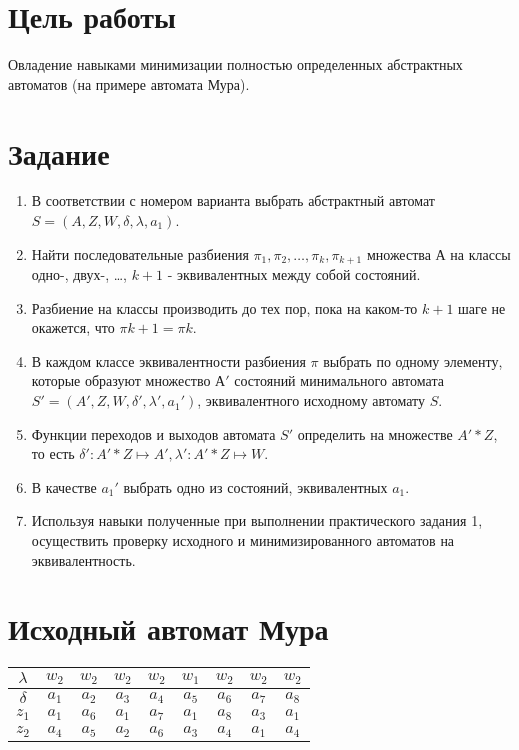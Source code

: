\documentclass[listings]{labreport}
\begin{document}
\maketitlepage

\section*{Цель работы}

Овладение навыками минимизации полностью определенных абстрактных автоматов
(на примере автомата Мура).

\section*{Задание}

\begin{enumerate}
\item В соответствии с номером варианта выбрать абстрактный автомат $S=(A,Z,W,\delta,\lambda,a_1)$.
\item Найти последовательные разбиения $\pi_1,\pi_2,\ldots,\pi_k,\pi_{k+1}$ множества $А$ на классы одно-, двух-, \ldots, $k+1$ - эквивалентных между собой состояний.
\item Разбиение на классы производить до тех пор, пока на каком-то $k+1$ шаге не окажется, что $\pi k+1 = \pi k$.
\item В каждом классе эквивалентности разбиения $\pi$ выбрать по одному элементу, которые образуют множество $А'$ состояний минимального автомата $S'=(A',Z,W,\delta',\lambda',a_1')$, эквивалентного исходному автомату $S$.
\item Функции переходов и выходов автомата $S'$ определить на множестве $A' *Z$, то есть $\delta': A' *Z \mapsto A', \lambda': A' *Z \mapsto W$.
\item В качестве $a_1'$ выбрать одно из состояний, эквивалентных $a_1$.
\item Используя навыки полученные при выполнении практического задания 1, осуществить проверку исходного и минимизированного автоматов на эквивалентность. 
\end{enumerate}

\section*{Исходный автомат Мура}

\begin{tabular}{|*{9}{c|}}
\hline
$\lambda$ & $w_2$ & $w_2$ & $w_2$ & $w_2$ & $w_1$ & $w_2$ & $w_2$ & $w_2$ \\\hline
$\delta$  & $a_1$ & $a_2$ & $a_3$ & $a_4$ & $a_5$ & $a_6$ & $a_7$ & $a_8$ \\\hline
$z_1$     & $a_1$ & $a_6$ & $a_1$ & $a_7$ & $a_1$ & $a_8$ & $a_3$ & $a_1$ \\\hline
$z_2$     & $a_4$ & $a_5$ & $a_2$ & $a_6$ & $a_3$ & $a_4$ & $a_1$ & $a_4$ \\\hline
\end{tabular}
\end{document}
